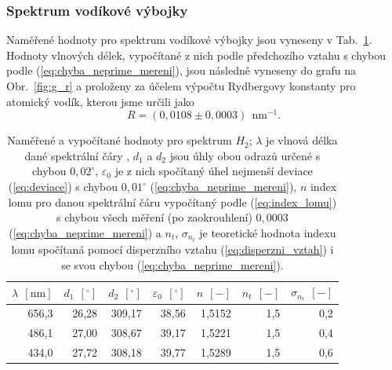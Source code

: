 \documentclass[english]{article}
\newcommand{\unit}[1]{\ \mathrm{#1}}
\begin{document}
		\subsubsection{Spektrum vodíkové výbojky}
			Naměřené hodnoty pro spektrum vodíkové výbojky jsou vyneseny v Tab.~\ref{tab:h2}. Hodnoty vlnových délek, vypočítané z nich podle předchozího vztahu s chybou podle (\ref{eq:chyba_neprime_mereni}), jsou následně vyneseny do grafu na Obr.~\ref{fig:g_r} a proloženy za účelem výpočtu Rydbergovy konstanty pro atomický vodík, kterou jsme určili jako
			\begin{equation}
				R = ( 0,0108\pm0,0003 )~\unit{ nm^{-1} }.
			\end{equation}
		
			\begin{table}[htbp]
			  \centering
    \begin{tabular}{|r|r|r|r|r|r|r|}
    \hline
    \boldmath{}\textbf{$\lambda~\unit{[nm]}$}\unboldmath{} & \boldmath{}\textbf{$d_1~\unit{[^\circ]}$}\unboldmath{} & \boldmath{}\textbf{$d_2~\unit{[^\circ]}$}\unboldmath{} & \boldmath{}\textbf{$\varepsilon_0~\unit{[^\circ]}$}\unboldmath{} & \boldmath{}\textbf{$n~\unit{[-]}$}\unboldmath{} & \boldmath{}\textbf{$n_{t}~\unit{[-]}$}\unboldmath{} & \boldmath{}\textbf{$\sigma_{n_{t}}~\unit{[-]}$}\unboldmath{} \bigstrut\\
    \hline
    656,3 & 26,28 & 309,17 & 38,56 & 1,5152 & 1,5   & 0,2 \bigstrut\\
    \hline
    486,1 & 27,00 & 308,67 & 39,17 & 1,5221 & 1,5   & 0,4 \bigstrut\\
    \hline
    434,0 & 27,72 & 308,18 & 39,77 & 1,5289 & 1,5   & 0,6 \bigstrut\\
    \hline
    \end{tabular}%

			    \caption{Naměřené a vypočítané hodnoty pro spektrum $H_2$; $\lambda$ je vlnová délka dané spektrální čáry \cite{bib:na_miste}, $d_1$ a $d_2$ jsou úhly obou odrazů určené s chybou $0,02^\circ$, $\varepsilon_0$ je z nich spočítaný úhel nejmenší deviace (\ref{eq:deviace}) s chybou $0,01^\circ$ (\ref{eq:chyba_neprime_mereni}), $n$ index lomu pro danou spektrální čáru vypočítaný podle (\ref{eq:index_lomu}) s chybou všech měření (po zaokrouhlení) $0,0003$ (\ref{eq:chyba_neprime_mereni}) a $n_t$, $\sigma_{n_t}$ je teoretické hodnota indexu lomu spočítaná pomocí disperzního vztahu (\ref{eq:disperzni_vztah}) i se svou chybou (\ref{eq:chyba_neprime_mereni}).}
			  \label{tab:h2}%
			\end{table}%
		
\end{document}
